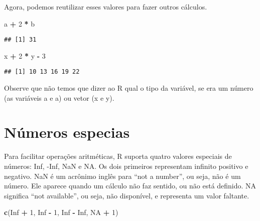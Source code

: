 \documentclass[]{book}
\newenvironment{Shaded}{\begin{snugshade}}{\end{snugshade}}
\newcommand{\DecValTok}[1]{\textcolor[rgb]{0.00,0.00,0.81}{#1}}
\newcommand{\KeywordTok}[1]{\textcolor[rgb]{0.13,0.29,0.53}{\textbf{#1}}}
\newcommand{\NormalTok}[1]{#1}
\newcommand{\OperatorTok}[1]{\textcolor[rgb]{0.81,0.36,0.00}{\textbf{#1}}}
\newcommand{\OtherTok}[1]{\textcolor[rgb]{0.56,0.35,0.01}{#1}}
\newcommand{\StringTok}[1]{\textcolor[rgb]{0.31,0.60,0.02}{#1}}
\theoremstyle{definition}
\theoremstyle{definition}
\theoremstyle{definition}
\theoremstyle{remark}
\begin{document}
Agora, podemos reutilizar esses valores para fazer outros cálculos.

\begin{Shaded}
\begin{Highlighting}[]
\NormalTok{a }\OperatorTok{+}\StringTok{ }\DecValTok{2} \OperatorTok{*}\StringTok{ }\NormalTok{b}
\end{Highlighting}
\end{Shaded}

\begin{verbatim}
## [1] 31
\end{verbatim}

\begin{Shaded}
\begin{Highlighting}[]
\NormalTok{x }\OperatorTok{+}\StringTok{ }\DecValTok{2} \OperatorTok{*}\StringTok{ }\NormalTok{y }\OperatorTok{-}\StringTok{ }\DecValTok{3}
\end{Highlighting}
\end{Shaded}

\begin{verbatim}
## [1] 10 13 16 19 22
\end{verbatim}

Observe que não temos que dizer ao R qual o tipo da variável, se era um número (as variáveis a e a) ou vetor (x e y).

\hypertarget{nuxfameros-especias}{%
\section{Números especias}\label{nuxfameros-especias}}

Para facilitar operações aritméticas, R suporta quatro valores especiais de números: Inf, -Inf, NaN e NA.
Os dois primeiros representam infinito positivo e negativo.
NaN é um acrônimo inglês para ``not a number'', ou seja, não é um número.
Ele aparece quando um cálculo não faz sentido, ou não está definido.
NA significa ``not available'', ou seja, não disponível, e representa um valor faltante.

\begin{Shaded}
\begin{Highlighting}[]
\KeywordTok{c}\NormalTok{(}\OtherTok{Inf} \OperatorTok{+}\StringTok{ }\DecValTok{1}\NormalTok{, }\OtherTok{Inf} \OperatorTok{-}\StringTok{ }\DecValTok{1}\NormalTok{, }\OtherTok{Inf} \OperatorTok{-}\StringTok{ }\OtherTok{Inf}\NormalTok{, }\OtherTok{NA} \OperatorTok{+}\StringTok{ }\DecValTok{1}\NormalTok{)}
\end{Highlighting}
\end{Shaded}
\end{document}
